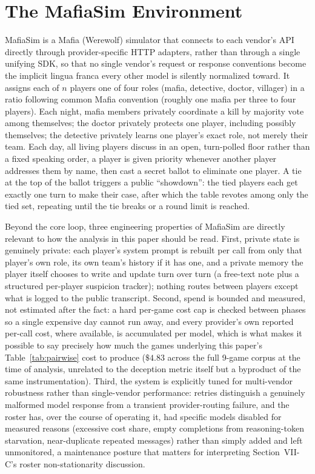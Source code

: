 \documentclass[10pt,conference]{IEEEtran}
\begin{document}
\section{The MafiaSim Environment}

MafiaSim is a Mafia (Werewolf) simulator that connects to each vendor's API directly through provider-specific HTTP adapters, rather than through a single unifying SDK, so that no single vendor's request or response conventions become the implicit lingua franca every other model is silently normalized toward. It assigns each of $n$ players one of four roles (mafia, detective, doctor, villager) in a ratio following common Mafia convention (roughly one mafia per three to four players). Each night, mafia members privately coordinate a kill by majority vote among themselves; the doctor privately protects one player, including possibly themselves; the detective privately learns one player's exact role, not merely their team. Each day, all living players discuss in an open, turn-polled floor rather than a fixed speaking order, a player is given priority whenever another player addresses them by name, then cast a secret ballot to eliminate one player. A tie at the top of the ballot triggers a public ``showdown'': the tied players each get exactly one turn to make their case, after which the table revotes among only the tied set, repeating until the tie breaks or a round limit is reached.

Beyond the core loop, three engineering properties of MafiaSim are directly relevant to how the analysis in this paper should be read. First, private state is genuinely private: each player's system prompt is rebuilt per call from only that player's own role, its own team's history if it has one, and a private memory the player itself chooses to write and update turn over turn (a free-text note plus a structured per-player suspicion tracker); nothing routes between players except what is logged to the public transcript. Second, spend is bounded and measured, not estimated after the fact: a hard per-game cost cap is checked between phases so a single expensive day cannot run away, and every provider's own reported per-call cost, where available, is accumulated per model, which is what makes it possible to say precisely how much the games underlying this paper's Table~\ref{tab:pairwise} cost to produce ($\$4.83$ across the full 9-game corpus at the time of analysis, unrelated to the deception metric itself but a byproduct of the same instrumentation). Third, the system is explicitly tuned for multi-vendor robustness rather than single-vendor performance: retries distinguish a genuinely malformed model response from a transient provider-routing failure, and the roster has, over the course of operating it, had specific models disabled for measured reasons (excessive cost share, empty completions from reasoning-token starvation, near-duplicate repeated messages) rather than simply added and left unmonitored, a maintenance posture that matters for interpreting Section~VII-C's roster non-stationarity discussion.
\end{document}
